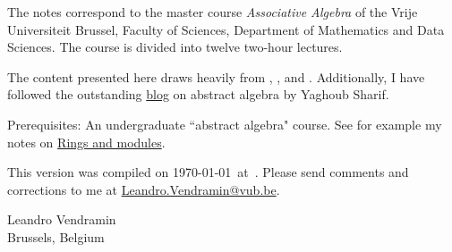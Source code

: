\preface

The notes correspond to the master  
course \emph{Associative Algebra} of the 
Vrije Universiteit Brussel, 
Faculty of Sciences, 
Department of Mathematics and Data Sciences. The course
is divided into twelve two-hour lectures. 

The content presented here draws heavily from \cite{MR3308118}, \cite{MR1449137}, 
and \cite{MR798076}. Additionally, I have 
followed the outstanding \href{https://ysharifi.wordpress.com}{blog} on 
abstract algebra by Yaghoub Sharif.

Prerequisites: An undergraduate ``abstract algebra" course. See for example
my notes on \href{https://github.com/vendramin/rings}{Rings and modules}. 

\medskip
This version 
was compiled on \today~at~\currenttime.
Please send comments and corrections to me at \url{Leandro.Vendramin@vub.be}. 


\bigskip
\begin{flushright}
Leandro Vendramin\\Brussels, Belgium\par
\end{flushright}
